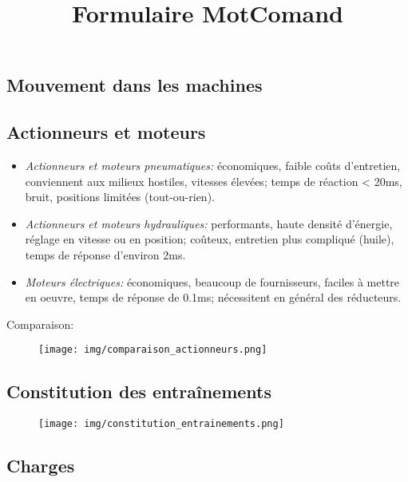 \documentclass[10pt]{article} %
\title{Formulaire MotComand}
\begin{document}
	
	\begin{multicols}{3}
		\maketitle
		\section*{Mouvement dans les machines}
		
			\subsection*{Actionneurs et moteurs}
	
				\begin{itemize}
					\item \emph{Actionneurs et moteurs pneumatiques:} économiques, faible coûts d'entretien, conviennent aux milieux hostiles, vitesses élevées; temps de réaction < 20ms, bruit, positions limitées (tout-ou-rien).
					\item \emph{Actionneurs et moteurs hydrauliques:} performants, haute densité d'énergie, réglage en vitesse ou en position; coûteux, entretien plus compliqué (huile), temps de réponse d'environ 2ms.
					\item \emph{Moteurs électriques:} économiques, beaucoup de fournisseurs, faciles à mettre en oeuvre, temps de réponse de 0.1ms; nécessitent en général des réducteurs.
				\end{itemize}
				
				Comparaison:
				
				\begin{figure}[H]
					\texttt{[image: img/comparaison\_actionneurs.png]}
					\centering
				\end{figure}
			
			\subsection*{Constitution des entraînements}
				
				\begin{figure}[H]
					\texttt{[image: img/constitution\_entrainements.png]}
					\centering
				\end{figure}
				
			\subsection*{Charges}
				

\end{multicols}
\end{document}
